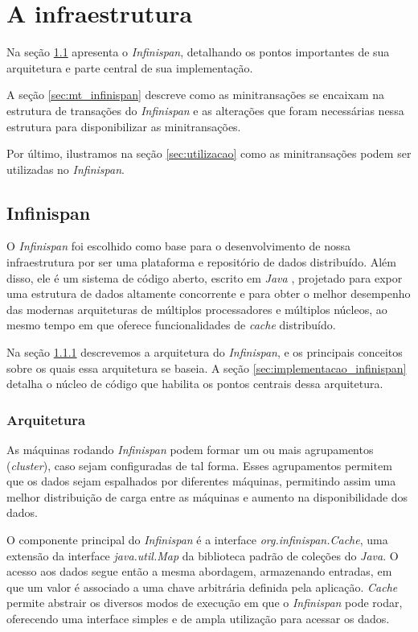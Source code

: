 \documentclass[11pt,twoside,a4paper]{book}
\begin{document}
\chapter{A infraestrutura}
\label{chap:implementacao}
Na seção \ref{sec:infinispan} apresenta o \emph{Infinispan}, detalhando os pontos importantes de sua arquitetura e parte central de sua implementação. 

A seção \ref{sec:mt_infinispan} descreve como as minitransações se encaixam na estrutura de transações do \emph{Infinispan} e as alterações que foram necessárias nessa estrutura para disponibilizar as minitransações.

Por último, ilustramos na seção \ref{sec:utilizacao} como as minitransações podem ser utilizadas no \emph{Infinispan}.

\section{Infinispan}
\label{sec:infinispan}
O \emph{Infinispan} foi escolhido como base para o desenvolvimento de nossa infraestrutura por ser uma plataforma e repositório de dados distribuído. Além disso, ele é um sistema de código aberto, escrito em \emph{Java} \cite{java}, projetado para expor uma estrutura de dados altamente concorrente e para obter o melhor desempenho das modernas arquiteturas de múltiplos processadores e múltiplos núcleos, ao mesmo tempo em que oferece funcionalidades de \emph{cache} distribuído.

Na seção \ref{sec:arquitetura_infinispan} descrevemos a arquitetura do \emph{Infinispan}, e os principais conceitos sobre os quais essa arquitetura se baseia. A seção \ref{sec:implementacao_infinispan} detalha o núcleo de código que habilita os pontos centrais dessa arquitetura.

\subsection{Arquitetura}
\label{sec:arquitetura_infinispan}
As máquinas rodando \emph{Infinispan} podem formar um ou mais agrupamentos (\emph{cluster}), caso sejam configuradas de tal forma. Esses agrupamentos permitem que os dados sejam espalhados por diferentes máquinas, permitindo assim uma melhor distribuição de carga entre as máquinas e aumento na disponibilidade dos dados.

O componente principal do \emph{Infinispan} é a interface \emph{org.infinispan.Cache}, uma extensão da interface \emph{java.util.Map} da biblioteca padrão de coleções do \emph{Java}. O acesso aos dados segue então a mesma abordagem, armazenando entradas, em que um valor é associado a uma chave arbitrária definida pela aplicação. \emph{Cache} permite abstrair os diversos modos de execução em que o \emph{Infinispan} pode rodar, oferecendo uma interface simples e de ampla utilização para acessar os dados.
\end{document}
